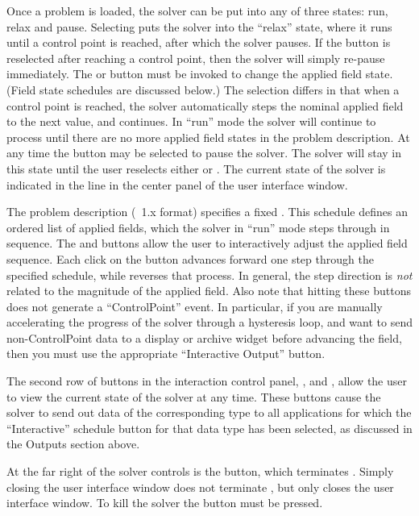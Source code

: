 Once a problem is loaded, the solver can be put into any of three
states: run, relax and pause.  Selecting  puts the solver
into the ``relax'' state, where it runs until a control point is
reached, after which the solver pauses.  If the  button is
reselected after reaching a control point, then the solver will simply
re-pause immediately.  The  or  button must be
invoked to change the applied field state. (Field state schedules are
discussed below.)  The  selection differs in that when a
control point is reached, the solver automatically steps the nominal
applied field to the next value, and continues.  In ``run'' mode the
solver will continue to process until there are no more applied field
states in the problem description.  At any time the  button
may be selected to pause the solver.  The solver will stay in this state
until the user reselects either  or .  The current
state of the solver is indicated in the  line in the center
panel of the user interface window.

The problem description (\MIF~1.x format)
specifies a fixed .  This schedule defines an
ordered list of applied fields, which the solver in ``run'' mode steps
through in sequence.  The  and  buttons allow
the user to interactively adjust the applied field sequence.  Each click
on the
 button advances forward one step through the specified
schedule, while  reverses that process.  In general, the
step direction is {\em not} related to the magnitude of the applied
field.  Also note that hitting these buttons does not generate a
``ControlPoint'' event.  In particular, if you are manually accelerating
the progress of the solver through a hysteresis loop, and want to send
non-ControlPoint data to a display or archive widget before advancing
the field, then you must use the appropriate ``Interactive Output''
button.

The second row of buttons in the interaction control panel,
,  and , allow the
user to view the current state of the solver at any time.  These buttons
cause the solver to send out data of the corresponding type to all
applications for which the ``Interactive'' schedule button for that 
data type has been selected, as discussed in the Outputs section above.

At the far right of the solver controls is the  button, which
terminates .  Simply
closing the user interface window does not terminate ,
but only closes the user interface window.  To kill the solver the
 button must be pressed.

